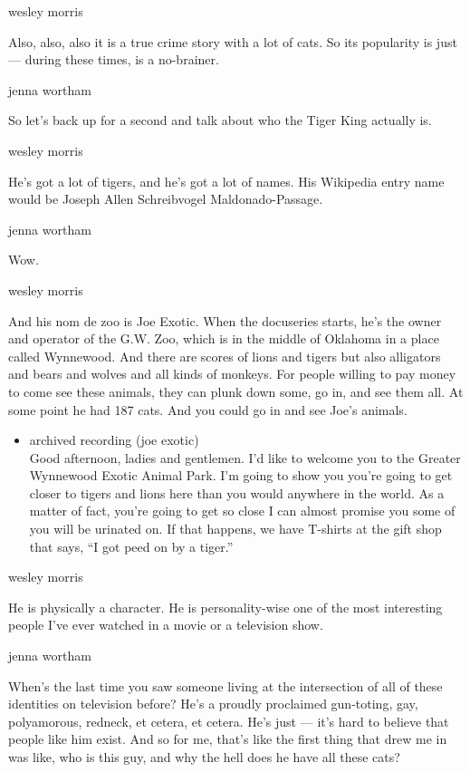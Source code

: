 wesley morris

Also, also, also it is a true crime story with a lot of cats. So its
popularity is just --- during these times, is a no-brainer.

jenna wortham

So let's back up for a second and talk about who the Tiger King actually
is.

wesley morris

He's got a lot of tigers, and he's got a lot of names. His Wikipedia
entry name would be Joseph Allen Schreibvogel Maldonado-Passage.

jenna wortham

Wow.

wesley morris

And his nom de zoo is Joe Exotic. When the docuseries starts, he's the
owner and operator of the G.W. Zoo, which is in the middle of Oklahoma
in a place called Wynnewood. And there are scores of lions and tigers
but also alligators and bears and wolves and all kinds of monkeys. For
people willing to pay money to come see these animals, they can plunk
down some, go in, and see them all. At some point he had 187 cats. And
you could go in and see Joe's animals.

\begin{itemize}
\tightlist
\item
  archived recording (joe exotic)\\
  Good afternoon, ladies and gentlemen. I'd like to welcome you to the
  Greater Wynnewood Exotic Animal Park. I'm going to show you you're
  going to get closer to tigers and lions here than you would anywhere
  in the world. As a matter of fact, you're going to get so close I can
  almost promise you some of you will be urinated on. If that happens,
  we have T-shirts at the gift shop that says, ``I got peed on by a
  tiger.''
\end{itemize}

wesley morris

He is physically a character. He is personality-wise one of the most
interesting people I've ever watched in a movie or a television show.

jenna wortham

When's the last time you saw someone living at the intersection of all
of these identities on television before? He's a proudly proclaimed
gun-toting, gay, polyamorous, redneck, et cetera, et cetera. He's just
--- it's hard to believe that people like him exist. And so for me,
that's like the first thing that drew me in was like, who is this guy,
and why the hell does he have all these cats?

